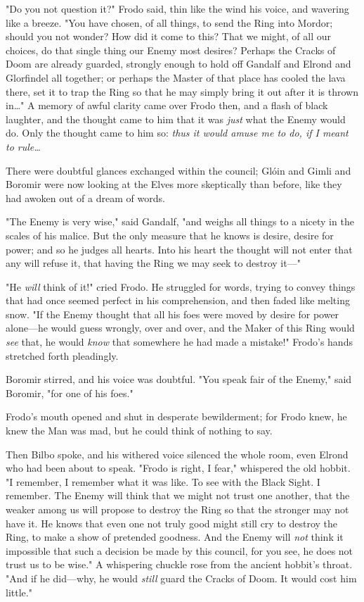 "Do you not question it?" Frodo said, thin like the wind his voice, and 
wavering like a breeze. "You have chosen, of all things, to send the Ring into 
Mordor; should you not wonder? How did it come to this? That we might, of all 
our choices, do that single thing our Enemy most desires? Perhaps the Cracks of 
Doom are already guarded, strongly enough to hold off Gandalf and Elrond and 
Glorfindel all together; or perhaps the Master of that place has cooled the 
lava there, set it to trap the Ring so that he may simply bring it out after it 
is thrown in{\ldots}" A memory of awful clarity came over Frodo then, and a 
flash of black laughter, and the thought came to him that it was \emph{just} 
what the Enemy would do. Only the thought came to him so: \emph{thus it would 
amuse me to do, if I meant to rule{\ldots}}

There were doubtful glances exchanged within the council; Glóin and Gimli and 
Boromir were now looking at the Elves more skeptically than before, like they 
had awoken out of a dream of words.

"The Enemy is very wise," said Gandalf, "and weighs all things to a nicety in 
the scales of his malice. But the only measure that he knows is desire, desire 
for power; and so he judges all hearts. Into his heart the thought will not 
enter that any will refuse it, that having the Ring we may seek to destroy 
it---"

"He \emph{will} think of it!" cried Frodo. He struggled for words, trying to 
convey things that had once seemed perfect in his comprehension, and then faded 
like melting snow. "If the Enemy thought that all his foes were moved by desire 
for power alone---he would guess wrongly, over and over, and the Maker of this 
Ring would \emph{see} that, he would \emph{know} that somewhere he had made a 
mistake!" Frodo's hands stretched forth pleadingly.

Boromir stirred, and his voice was doubtful. "You speak fair of the Enemy," 
said Boromir, "for one of his foes."

Frodo's mouth opened and shut in desperate bewilderment; for Frodo knew, he 
knew the Man was mad, but he could think of nothing to say.

Then Bilbo spoke, and his withered voice silenced the whole room, even Elrond 
who had been about to speak. "Frodo is right, I fear," whispered the old 
hobbit. "I remember, I remember what it was like. To see with the Black Sight. 
I remember. The Enemy will think that we might not trust one another, that the 
weaker among us will propose to destroy the Ring so that the stronger may not 
have it. He knows that even one not truly good might still cry to destroy the 
Ring, to make a show of pretended goodness. And the Enemy will \emph{not} think 
it impossible that such a decision be made by this council, for you see, he 
does not trust us to be wise." A whispering chuckle rose from the ancient 
hobbit's throat. "And if he did---why, he would \emph{still} guard the Cracks 
of Doom. It would cost him little."

